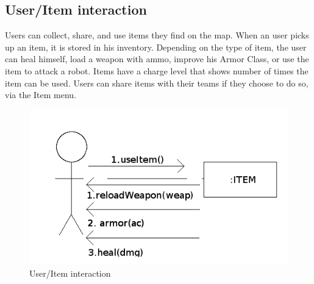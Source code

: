\documentclass{beamer}
\begin{document}
\begin{frame}
\subsection{User/Item interaction}
Users can collect, share, and use items they find on the map. When an user picks up an item, it is stored in his inventory. Depending on the type of item, the user can heal himself, load a weapon with ammo, improve his Armor Class, or use the item to attack a robot. Items have a charge level that shows number of times the item can be used. Users can share items with their teams if they choose to do so, via the Item menu.
\begin{figure}[htb]
\centering
\includegraphics[scale=0.4]{item}
\caption{User/Item interaction}
\end{figure}
\end{frame}
\end{document}
